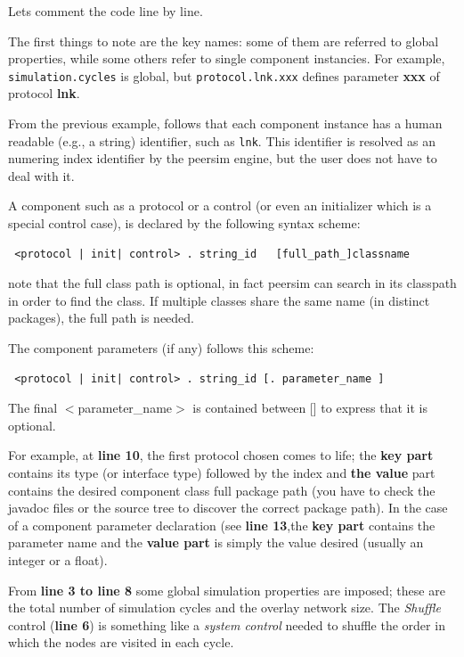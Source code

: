 \documentclass[a4paper,11pt]{article}
\begin{document}
Lets comment the code line by line. 

The first things to note are the
key names: some of them are referred to global properties, while some
others refer to single component instancies. For example,
\texttt{simulation.cycles} is global, but \texttt{protocol.lnk.xxx}
defines parameter \textbf{xxx} of protocol \textbf{lnk}.

From the previous example, follows that each component instance has a
human readable (e.g., a string) identifier, such as \texttt{lnk}. This
identifier is resolved as an numering index identifier by the peersim
engine, but the user does not have to deal with it. 

A component such as a protocol or a control (or even an initializer
which is a special control case), is declared by  the
following syntax scheme:

\footnotesize
\begin{verbatim} <protocol | init| control> . string_id   [full_path_]classname
\end{verbatim} \normalsize

note that the full class path is optional, in fact peersim can search
in its classpath in order to find the class. If multiple classes share
the same name (in distinct packages), the full path is needed.
  
The component parameters (if any) follows this scheme:

\footnotesize
\begin{verbatim} <protocol | init| control> . string_id [. parameter_name ]
\end{verbatim} \normalsize


The final $<$parameter\_name$>$ is contained between {[}{]} to express
that it is optional. 

For example, at \textbf{line 10}, the first protocol chosen comes to life;
the \textbf{key part} contains its type (or interface type) followed
by the index and \textbf{the
value} part contains the desired component class full package path
(you have to check the javadoc files or the source tree to discover
the correct package path). In the case of a component parameter
declaration (see \textbf{line 13},the \textbf{key part} contains the parameter name and the \textbf{value
part} is simply the value desired (usually an integer or a float).

From \textbf{line 3 to line 8}
some global simulation properties are imposed; these are the total
number of simulation cycles and the overlay network size. The
\emph{Shuffle} control (\textbf{line 6}) is something like a
\emph{system control} needed to shuffle the order in which the nodes
are visited in each 
cycle. 
\end{document}
